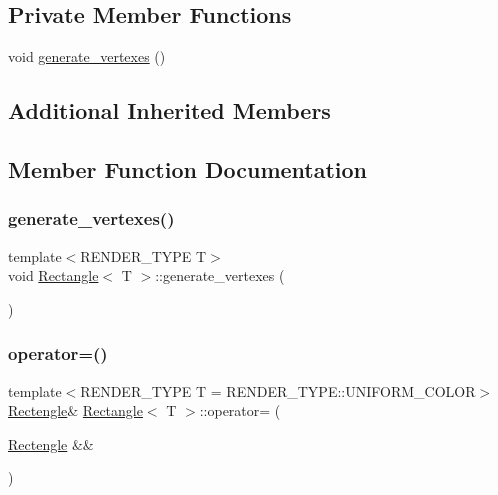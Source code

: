 \subsection*{Private Member Functions}
\begin{DoxyCompactItemize}
\item 
void \mbox{\hyperlink{classRectangle_a0f9d67fb9478883f067c47cdc7bf7bca}{generate\+\_\+vertexes}} ()
\end{DoxyCompactItemize}
\subsection*{Additional Inherited Members}


\subsection{Member Function Documentation}
\mbox{\label{classRectangle_a0f9d67fb9478883f067c47cdc7bf7bca}} 
\subsubsection{\texorpdfstring{generate\+\_\+vertexes()}{generate\_vertexes()}}
{\footnotesize\ttfamily template$<$R\+E\+N\+D\+E\+R\+\_\+\+T\+Y\+PE T$>$ \\
void \mbox{\hyperlink{classRectangle}{Rectangle}}$<$ T $>$\+::generate\+\_\+vertexes (\begin{DoxyParamCaption}{ }\end{DoxyParamCaption})\hspace{0.3cm}{\ttfamily [private]}}

\mbox{\label{classRectangle_aa73d8d9047a77ee51854d578edffe9c3}} 
\subsubsection{\texorpdfstring{operator=()}{operator=()}\hspace{0.1cm}{\footnotesize\ttfamily [1/2]}}
{\footnotesize\ttfamily template$<$R\+E\+N\+D\+E\+R\+\_\+\+T\+Y\+PE T = R\+E\+N\+D\+E\+R\+\_\+\+T\+Y\+P\+E\+::\+U\+N\+I\+F\+O\+R\+M\+\_\+\+C\+O\+L\+OR$>$ \\
\mbox{\hyperlink{classRectangle_ac286ca610cf35b12f3fd1636312cb1ce}{Rectengle}}\& \mbox{\hyperlink{classRectangle}{Rectangle}}$<$ T $>$\+::operator= (\begin{DoxyParamCaption}\item[{\mbox{\hyperlink{classRectangle_ac286ca610cf35b12f3fd1636312cb1ce}{Rectengle}} \&\&}]{ }\end{DoxyParamCaption})\hspace{0.3cm}{\ttfamily [default]}}

